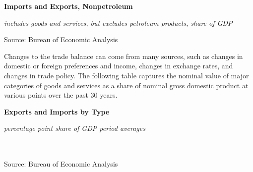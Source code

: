 \documentclass{report}
\makeatletter
\newcommand{\tbllink}[1]{\href{https://raw.githubusercontent.com/bdecon/US-chartbook/master/chartbook/data/#1}{\faTable}}
\newcommand*\short[1]{\expandafter\@gobbletwo\number\numexpr#1\relax}
\newcommand{\dateaxisticks}{
		date coordinates in=x, axis line style={draw=none},
		xmax={2020-08-10},
		max space between ticks=40,	    
		xtick={{1990-01-01}, {1992-01-01}, {1994-01-01}, 
			{1996-01-01}, {1998-01-01}, {2000-01-01}, 
			{2002-01-01}, {2004-01-01}, {2006-01-01},
			{2008-01-01}, {2010-01-01}, {2012-01-01}, {2014-01-01},
		    {2016-01-01}, {2018-01-01}, {2020-01-01}},
		minor xtick={{1989-01-01}, {1991-01-01}, {1993-01-01},
			{1995-01-01}, {1997-01-01}, {1999-01-01}, 
			{2001-01-01}, {2003-01-01}, {2005-01-01}, {2007-01-01},
		    {2009-01-01}, {2011-01-01}, {2013-01-01}, {2015-01-01},
		    {2017-01-01}, {2019-01-01}},
		enlarge y limits={0.06}, enlarge x limits={0.01},
		}
\newcommand{\bbar}[2]{extra #1 ticks = {{#2}}, extra #1 tick labels = ,
		extra #1 tick style = {grid=major, grid style={thick, black!25}},}
\newcommand{\thickline}[4]{\addplot[ultra thick, no markers, color=#1] 
		table [x=#2, y=#3, col sep=comma] {#4};	}
\newcommand{\rbars}{
		\fill[color=black!10] (axis cs:{1990-07-01},\pgfkeysvalueof{/pgfplots/ymin}) rectangle 
			(axis cs:{1991-03-01}, \pgfkeysvalueof{/pgfplots/ymax});
		\fill[color=black!10] (axis cs:{2007-12-01},\pgfkeysvalueof{/pgfplots/ymin}) rectangle 
			(axis cs:{2009-07-01}, \pgfkeysvalueof{/pgfplots/ymax});
		\fill[color=black!10] (axis cs:{2001-03-01},\pgfkeysvalueof{/pgfplots/ymin}) rectangle 
			(axis cs:{2001-11-01}, \pgfkeysvalueof{/pgfplots/ymax});
		\fill[color=black!10] (axis cs:{2020-02-01},\pgfkeysvalueof{/pgfplots/ymin}) rectangle 
			(axis cs:{2020-09-01}, \pgfkeysvalueof{/pgfplots/ymax});}
\makeatother
\begin{document}
{{{{{{\begin{minipage}{0.76\textwidth}
\vspace{8mm}

\small 

\vspace{3mm}

\normalsize \textbf{Imports and Exports, Nonpetroleum}

\footnotesize{\textit{includes goods and services, but excludes petroleum products, share of GDP}}

\hspace*{-2mm} 

\footnotesize{Source: Bureau of Economic Analysis} \hfill \tbllink{eximgdp.csv}
\end{minipage}
\newpage
\begin{minipage}{0.76\textwidth}
\small Changes to the trade balance can come from many sources, such as changes in domestic or foreign preferences and income, changes in exchange rates, and changes in trade policy. The following table captures the nominal value of major categories of goods and services as a share of nominal gross domestic product at various points over the past 30 years. 
\end{minipage}

\noindent \normalsize \textbf{Exports and Imports by Type}\\
\footnotesize{\textit{percentage point share of GDP \hspace{40mm} period averages}\\ 
\noindent {} \setlength{\tabcolsep}{3.1pt} \color{black!90}
		{\renewcommand{\arraystretch}{1.55}
		 \begin{tabular}{p{42mm} R{7.1mm} R{7.1mm} R{7.1mm} R{7.1mm} R{7.1mm} 
		   R{7.1mm} R{7.1mm} R{7.1mm} }
			 \hline
		\end{tabular}}	\\
		
\vspace{-2mm}
\footnotesize{Source: Bureau of Economic Analysis}}

}}}}}}
\end{document}
